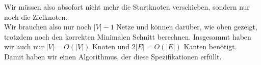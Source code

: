 \documentclass[11pt,a4paper,ngerman]{article}
\begin{document}
Wir müssen also absofort nicht mehr die Startknoten verschieben, sondern nur noch die Zielknoten.\\
Wir brauchen also nur noch $|V|-1$ Netze und können darüber, wie oben gezeigt, trotzdem noch den korrekten Minimalen Schnitt berechnen. Insgesammt haben wir auch nur $|V| = O(|V|)$ Knoten und $2|E| = O(|E|)$ Kanten benötigt.\\

Damit haben wir einen Algorithmus, der diese Spezifikationen erfüllt. 

\label{LastPage}
\end{document}
